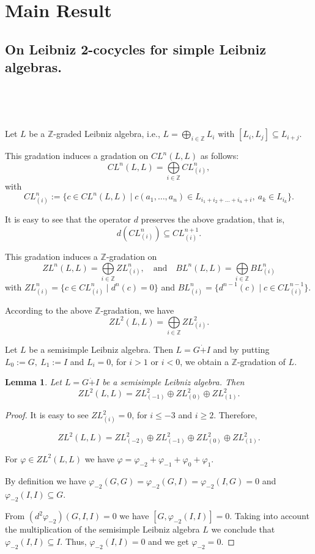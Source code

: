 \documentclass[12pt,reqno]{amsart}
\newtheorem{lem}[thm]{Lemma}
\numberwithin{equation}{section}
\begin{document}
\section{Main Result}

\subsection{On Leibniz 2-cocycles for simple Leibniz algebras.}

\

\

Let $L$ be a $\mathbb{Z}$-graded Leibniz algebra, i.e.,  $L=\bigoplus\limits_{i\in \mathbb{Z}}L_i$ with $[L_i,L_j]\subseteq L_{i+j}$.

This gradation induces a gradation on $CL^n(L,L)$ as follows:
\[CL^n(L,L)=\bigoplus\limits_{i\in \mathbb{Z}}CL^n_{(i)},\] with
\[CL^n_{(i)} :=\{c\in CL^{n}(L,L) \mid
c(a_1,\dots,a_n)\in L_{i_1+i_2+\dots+i_n+i}, \ a_k\in L_{i_k}\}.\]

It is easy to see that the operator $d$ preserves the above gradation, that is,
\[d(CL^n_{(i)})\subseteq CL^{n+1}_{(i)}.\]

This gradation induces a $\mathbb{Z}$-gradation on
\[ZL^n(L,L)=\bigoplus\limits_{i\in \mathbb{Z}}ZL^n_{(i)},  \quad \text{and}  \quad  BL^n(L,L)=\bigoplus\limits_{i\in \mathbb{Z}}BL^n_{(i)}\]
 with $ZL^n_{(i)}=\{ c\in CL^n_{(i)} \mid d^n(c)=0\}$ and $BL^n_{(i)}=\{ d^{n-1}(c) \mid  c\in CL^{n-1}_{(i)}\}$.

According to the above $\mathbb{Z}$-gradation, we have
\[ZL^2(L,L)=\bigoplus\limits_{i\in \mathbb{Z}}ZL^2_{(i)}.\]

Let $L$ be a semisimple Leibniz algebra. Then $L=G\dot{+}I$ and by putting $L_0:=G, \ L_1:=I$ and $L_i =0$, for $i>1$ or $i < 0$, we obtain a $\mathbb{Z}$-gradation of $L$.

\begin{lem} Let $L=G\dot{+}I$ be a semisimple Leibniz algebra. Then
\[ZL^2(L,L)= ZL^2_{(-1)} \oplus ZL^2_{(0)} \oplus ZL^2_{(1)}.\]
\end{lem}
\begin{proof} It is easy to see $ZL^2_{(i)}=0$, for $i \leq -3$ and $i \geq 2$. Therefore,

\[ZL^2(L,L)= ZL^2_{(-2)} \oplus ZL^2_{(-1)} \oplus ZL^2_{(0)} \oplus ZL^2_{(1)}.\]

For $\varphi\in ZL^2(L,L)$ we have $\varphi=\varphi_{-2}+\varphi_{-1}+\varphi_0+\varphi_1$.

By definition we have $\varphi_{-2}(G,G)=\varphi_{-2}(G,I)=\varphi_{-2}(I,G)=0$ and $\varphi_{-2}(I,I)\subseteq G$.

From $(d^2\varphi_{-2})(G,I,I)=0$ we have $[G,\varphi_{-2}(I,I)]=0$. Taking into account the multiplication of  the semisimple Leibniz algebra $L$
 we conclude that $\varphi_{-2}(I,I)\subseteq I$. Thus, $\varphi_{-2}(I,I)=0$ and we get $\varphi_{-2}=0$.
\end{proof}
\end{document}
